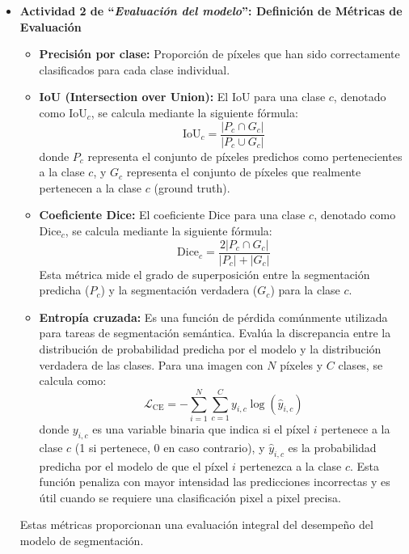 \begin{enumerate}
\begin{itemize}
  
    \item \textbf{Actividad 2 de “\textit{Evaluación del modelo}”: Definición de Métricas de Evaluación}
     \begin{itemize}
  \item \textbf{Precisión por clase:} Proporción de píxeles que han sido correctamente clasificados para cada clase individual.

  \item \textbf{IoU (Intersection over Union):} El IoU para una clase $c$, denotado como $\text{IoU}_c$, se calcula mediante la siguiente fórmula:
$$\text{IoU}_c = \frac{|P_c \cap G_c|}{|P_c \cup G_c|}$$
donde $P_c$ representa el conjunto de píxeles predichos como pertenecientes a la clase $c$, y $G_c$ representa el conjunto de píxeles que realmente pertenecen a la clase $c$ (ground truth).

  \item \textbf{Coeficiente Dice:} El coeficiente Dice para una clase $c$, denotado como $\text{Dice}_c$, se calcula mediante la siguiente fórmula:
$$\text{Dice}_c = \frac{2|P_c \cap G_c|}{|P_c| + |G_c|}$$
Esta métrica mide el grado de superposición entre la segmentación predicha ($P_c$) y la segmentación verdadera ($G_c$) para la clase $c$.
 

  \item \textbf{Entropía cruzada:} Es una función de pérdida comúnmente utilizada para tareas de segmentación semántica. Evalúa la discrepancia entre la distribución de probabilidad predicha por el modelo y la distribución verdadera de las clases. Para una imagen con $N$ píxeles y $C$ clases, se calcula como:
$$\mathcal{L}_{\text{CE}} = -\sum_{i=1}^{N} \sum_{c=1}^{C} y_{i,c} \log(\hat{y}_{i,c})$$
donde $y_{i,c}$ es una variable binaria que indica si el píxel $i$ pertenece a la clase $c$ (1 si pertenece, 0 en caso contrario), y $\hat{y}_{i,c}$ es la probabilidad predicha por el modelo de que el píxel $i$ pertenezca a la clase $c$. Esta función penaliza con mayor intensidad las predicciones incorrectas y es útil cuando se requiere una clasificación pixel a pixel precisa.
\end{itemize}

Estas métricas proporcionan una evaluación integral del desempeño del modelo de segmentación.


\end{itemize}
\end{enumerate}
